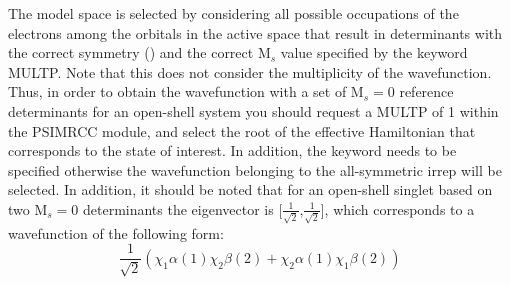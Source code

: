 The model space is selected by considering all possible occupations of the electrons among the orbitals in the active space that result in determinants with the correct symmetry () and the correct $\textrm{M}_s$ value specified by the keyword MULTP. Note that this does not consider the multiplicity of the wavefunction. Thus, in order to obtain the wavefunction with a set of $\textrm{M}_s = 0$ reference determinants for an open-shell system you should request a MULTP of 1 within the PSIMRCC module, and select the root of the effective Hamiltonian that corresponds to the state of interest. In addition, the  keyword needs to be specified otherwise the wavefunction belonging to the all-symmetric irrep will be selected. In addition, it should be noted that for an open-shell singlet based on two $\textrm{M}_s = 0$ determinants the eigenvector is [$\frac{1}{\sqrt{2}}\text{,}\frac{1}{\sqrt{2}}$], which corresponds to a wavefunction of the following form:
\begin{equation*}
\frac{1}{\sqrt{2}} \left( \chi_1 \alpha (1) \chi_2 \beta (2) + \chi_2 \alpha(1) \chi_1 \beta (2) \right)
\end{equation*}  

